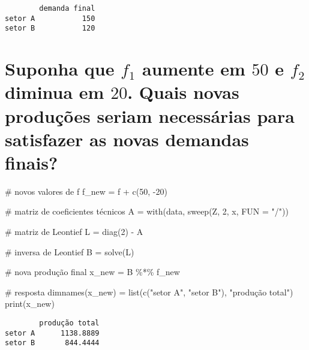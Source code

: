\documentclass[
  letterpaper,
  DIV=11,
  numbers=noendperiod]{scrreprt}
\newenvironment{Shaded}{\begin{snugshade}}{\end{snugshade}}
\newcommand{\AttributeTok}[1]{\textcolor[rgb]{0.80,0.80,0.80}{#1}}
\newcommand{\CommentTok}[1]{\textcolor[rgb]{0.50,0.62,0.50}{#1}}
\newcommand{\DecValTok}[1]{\textcolor[rgb]{0.86,0.86,0.80}{#1}}
\newcommand{\FunctionTok}[1]{\textcolor[rgb]{0.94,0.94,0.56}{#1}}
\newcommand{\NormalTok}[1]{\textcolor[rgb]{0.80,0.80,0.80}{#1}}
\newcommand{\OtherTok}[1]{\textcolor[rgb]{0.94,0.94,0.56}{#1}}
\newcommand{\SpecialCharTok}[1]{\textcolor[rgb]{0.86,0.64,0.64}{#1}}
\newcommand{\StringTok}[1]{\textcolor[rgb]{0.80,0.58,0.58}{#1}}
\begin{document}
\begin{verbatim}
        demanda final
setor A           150
setor B           120
\end{verbatim}

\section{\texorpdfstring{Suponha que \(f_1\) aumente em \(50\) e \(f_2\)
diminua em \(20\). Quais novas produções seriam necessárias para
satisfazer as novas demandas
finais?}{Suponha que f\_1 aumente em 50 e f\_2 diminua em 20. Quais novas produções seriam necessárias para satisfazer as novas demandas finais?}}\label{suponha-que-f_1-aumente-em-50-e-f_2-diminua-em-20.-quais-novas-produuxe7uxf5es-seriam-necessuxe1rias-para-satisfazer-as-novas-demandas-finais}

\begin{Shaded}
\begin{Highlighting}[numbers=left,,]
\CommentTok{\# novos valores de f}
\NormalTok{f\_new }\OtherTok{=}\NormalTok{ f }\SpecialCharTok{+} \FunctionTok{c}\NormalTok{(}\DecValTok{50}\NormalTok{, }\SpecialCharTok{{-}}\DecValTok{20}\NormalTok{)}

\CommentTok{\# matriz de coeficientes técnicos}
\NormalTok{A }\OtherTok{=} \FunctionTok{with}\NormalTok{(data, }\FunctionTok{sweep}\NormalTok{(Z, }\DecValTok{2}\NormalTok{, x, }\AttributeTok{FUN =} \StringTok{"/"}\NormalTok{))}

\CommentTok{\# matriz de Leontief}
\NormalTok{L }\OtherTok{=} \FunctionTok{diag}\NormalTok{(}\DecValTok{2}\NormalTok{) }\SpecialCharTok{{-}}\NormalTok{ A}

\CommentTok{\# inversa de Leontief}
\NormalTok{B }\OtherTok{=} \FunctionTok{solve}\NormalTok{(L)}

\CommentTok{\# nova produção final}
\NormalTok{x\_new }\OtherTok{=}\NormalTok{ B }\SpecialCharTok{\%*\%}\NormalTok{ f\_new}

\CommentTok{\# resposta}
\FunctionTok{dimnames}\NormalTok{(x\_new) }\OtherTok{=} \FunctionTok{list}\NormalTok{(}\FunctionTok{c}\NormalTok{(}\StringTok{"setor A"}\NormalTok{, }\StringTok{"setor B"}\NormalTok{), }\StringTok{"produção total"}\NormalTok{)}
\FunctionTok{print}\NormalTok{(x\_new)}
\end{Highlighting}
\end{Shaded}

\begin{verbatim}
        produção total
setor A      1138.8889
setor B       844.4444
\end{verbatim}
\end{document}
